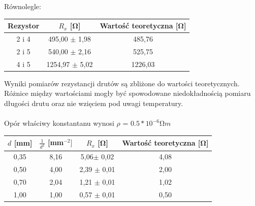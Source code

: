 \documentclass{article}
\begin{document}
Równolegle:

\begin{center}
    \begin{tabular}{ c | c | c}
    Rezystor & $R_x$ [\si{\ohm}] & Wartość teoretyczna [\si{\ohm}]\\
    \hline
    2 i 4    & 495,00 $\pm$ 1,98 & 485,76\\ 
    2 i 5  & 540,00 $\pm$ 2,16 & 525,75\\ 
    4 i 5    & 1254,97 $\pm$ 5,02 &  1226,03\\ 
    
    \end{tabular}
\end{center}

Wyniki pomiarów rezystancji drutów są zbliżone do wartości teoretycznych. Różnice między wartościami mogły być spowodowane niedokładnością pomiaru długości drutu oraz nie wzięciem pod uwagi temperatury.\\\\
Opór właściwy konstantanu wynosi $\rho$ = $0.5*10^{-6} \si{\ohm}m$

\begin{center}
    \begin{tabular}{ c|c | c|c }
    $d$ [mm] & $\frac{1}{d^2}$ [mm$^{-2}]$ &$R_x$ [\si{\ohm}] & Wartość teoretyczna [\si{\ohm}]\\
    \hline
    0,35 & 8,16 & 5,06$\pm$ 0,02 & 4,08\\ 
     0,50 & 4,00 &2,39 $\pm$ 0,01 & 2,00\\ 
     0,70 & 2,04 &1,21 $\pm$ 0,01 & 1,02\\ 
     1,00 & 1,00 &0,57 $\pm$ 0,01 & 0,50\\ 
     
    \end{tabular}
\end{center}
\end{document}
